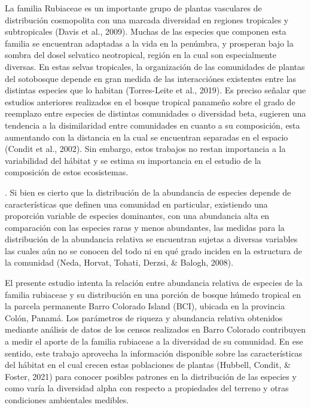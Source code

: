 \documentclass[11pt,]{article}
\begin{document}
La familia Rubiaceae es un importante grupo de plantas vasculares de
distribución cosmopolita con una marcada diversidad en regiones
tropicales y subtropicales (Davis et al., 2009). Muchas de las especies
que componen esta familia se encuentran adaptadas a la vida en la
penúmbra, y prosperan bajo la sombra del dosel selvatico neotropical,
región en la cual son especialmente diversas. En estas selvas
tropicales, la organización de las comunidades de plantas del sotobosque
depende en gran medida de las interacciónes existentes entre las
distintas especies que lo habitan (Torres-Leite et al., 2019). Es
preciso señalar que estudios anteriores realizados en el bosque tropical
panameño sobre el grado de reemplazo entre especies de distintas
comunidades o diversidad beta, sugieren una tendencia a la disimilaridad
entre comunidades en cuanto a su composición, esta aumentando con la
distancia en la cual se encuentran separadas en el espacio (Condit et
al., 2002). Sin embargo, estos trabajos no restan importancia a la
variabilidad del hábitat y se estima su importancia en el estudio de la
composición de estos ecosistemas.

. Si bien es cierto que la distribución de la abundancia de especies
depende de características que definen una comunidad en particular,
existiendo una proporción variable de especies dominantes, con una
abundancia alta en comparación con las especies raras y menos
abundantes, las medidas para la distribución de la abundancia relativa
se encuentran sujetas a diversas variables las cuales aún no se conocen
del todo ni en qué grado inciden en la estructura de la comunidad (Neda,
Horvat, Tohati, Derzsi, \& Balogh, 2008).

El presente estudio intenta la relación entre abundancia relativa de
especies de la familia rubiaceae y su distribución en una porción de
bosque húmedo tropical en la parcela permanente Barro Colorado Island
(BCI), ubicada en la provincia Colón, Panamá. Los parámetros de riqueza
y abundancia relativa obtenidos mediante análisis de datos de los censos
realizados en Barro Colorado contribuyen a medir el aporte de la familia
rubiaceae a la diversidad de su comunidad. En ese sentido, este trabajo
aprovecha la información disponible sobre las características del
hábitat en el cual crecen estas poblaciones de plantas (Hubbell, Condit,
\& Foster, 2021) para conocer posibles patrones en la distribución de
las especies y como varía la diversidad alpha con respecto a propiedades
del terreno y otras condiciones ambientales medibles.
\end{document}
